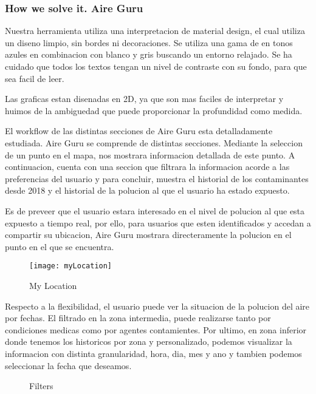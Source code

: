 \subsubsection{How we solve it. Aire Guru} 
Nuestra herramienta utiliza una interpretacion de material design, el cual utiliza un diseno limpio, sin bordes ni decoraciones.
Se utiliza una gama de en tonos azules en combinacion con blanco y gris buscando un entorno relajado. 
Se ha cuidado que todos los textos tengan un nivel de contraste con su fondo, para que sea facil de leer.

Las graficas estan disenadas en 2D, ya que son mas faciles de interpretar y huimos de la ambiguedad que puede
proporcionar la profundidad como medida.


El workflow de las distintas secciones de Aire Guru esta detalladamente estudiada.
Aire Guru se comprende de distintas secciones. Mediante la seleccion de un punto en el mapa, nos
mostrara informacion detallada de este punto. A continuacion, cuenta con una seccion que filtrara la informacion acorde a las preferencias del usuario
y para concluir, muestra el historial de los contaminantes desde 2018 y el historial de la polucion al que el usuario ha estado
expuesto. 

Es de preveer que el usuario estara interesado en el nivel de polucion al que esta expuesto a tiempo real, por ello, para usuarios
que esten identificados y accedan a compartir su ubicacion, Aire Guru mostrara directeramente la polucion en el punto en el 
que se encuentra.
\begin{figure}[ht]
    \centering
    \texttt{[image: myLocation]}
    \caption{My Location}
\end{figure}



Respecto a la flexibilidad, el usuario puede ver la situacion de la polucion del aire por fechas. El filtrado en la zona
intermedia, puede realizarse tanto por condiciones medicas como por agentes contamientes. Por ultimo, en zona inferior donde tenemos
los historicos por zona y personalizado, podemos visualizar la informacion con distinta granularidad, hora, dia, mes y ano y tambien podemos
seleccionar la fecha que deseamos.


\begin{figure}[ht]
    \centering
    \hfill
    \vfill
  
  \caption{Filters}
    \end{figure}


